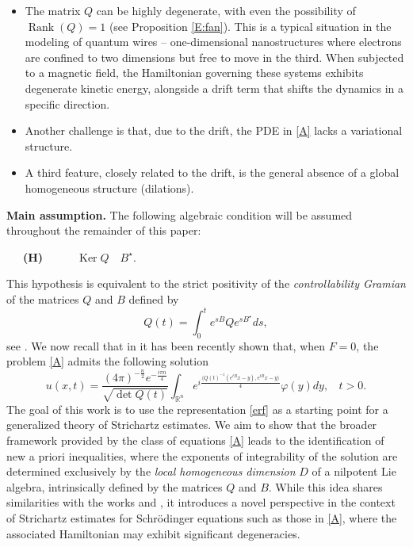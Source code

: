 \documentclass[11pt,letter]{amsart}
\def \vf{\varphi}
\newcommand{\Rn}{\mathbb R^n}
\numberwithin{equation}{section}
\newcommand{\sa}{\langle}
\newcommand{\da}{\rangle}
\numberwithin{equation}{section}
\begin{document}
\begin{itemize} \item[(i)] The matrix $Q$ can be highly degenerate, with even the possibility of $\operatorname{Rank}(Q) =1$ (see Proposition \ref{E:fan}). This is a typical situation in the modeling of quantum wires -- one-dimensional nanostructures where electrons are confined to two dimensions but free to move in the third. When subjected to a magnetic field, the Hamiltonian governing these systems exhibits degenerate kinetic energy, alongside a drift term that shifts the dynamics in a specific direction.

\item[(ii)] Another challenge is that, due to the drift, the PDE in \eqref{A} lacks a variational structure.

\item[(iii)] A third feature, closely related to the drift, is the general absence of a global homogeneous structure (dilations). 
\end{itemize}

\vskip 0.2in

\noindent \textbf{Main assumption.} The following algebraic condition will be assumed throughout the remainder of this paper:

\vskip 0.2in

\noindent \ \ \  \textbf{(H)}\ \ \ \ \ \ $\operatorname{Ker} Q$\ \ $B^\star$.

\vskip 0.2in

\noindent This hypothesis is equivalent to the strict positivity of the \emph{controllability Gramian} of the matrices $Q$ and $B$ defined by 
\begin{equation}\label{Ds}
Q(t) = \int_0^t e^{sB}Q e^{sB^\star} ds,
\end{equation} 
see  \cite[Theor.1.2, p.17]{Z}. We now recall that in \cite[Prop.2.4]{GL} it has been recently shown that, when $F = 0$, the problem \eqref{A} admits the following solution 
\begin{equation}\label{erf}
u(x,t)  = 
 \frac{(4\pi
)^{-\frac{n}{2}}e^{-\frac{i \pi n}4}}{\sqrt{\det Q(t)}}   \int_{\Rn} e^{i \frac{\sa Q(t)^{-1}(e^{tB}x-y),e^{tB}x - y\da}{4}} \vf(y) dy,\ \ \ \ t>0. 
\end{equation}
The goal of this work is to use the representation \eqref{erf}  as a starting point for a generalized theory of Strichartz estimates. We aim to show that the broader framework provided by the class of equations \eqref{A} leads to the identification of new a priori inequalities, where the exponents of integrability of the solution are determined exclusively by the \emph{local homogeneous dimension} $D$ of a nilpotent Lie algebra, intrinsically defined by the matrices $Q$ and $B$.
While this idea shares similarities with the works \cite{RS} and \cite{NSW}, it introduces a novel perspective in the context of Strichartz estimates for Schr\"odinger equations such as those in \eqref{A}, where the associated Hamiltonian may exhibit significant degeneracies. 
\end{document}
